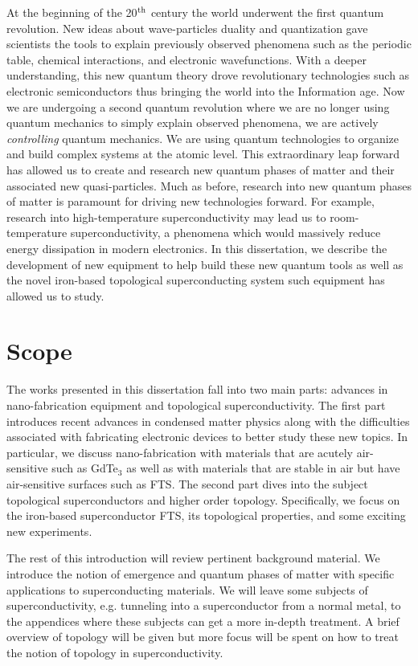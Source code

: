 At the beginning of the 20$\textsuperscript{th}$ century the world underwent the first quantum revolution. New ideas about wave-particles duality and quantization gave scientists the tools to explain previously observed phenomena such as the periodic table, chemical interactions, and electronic wavefunctions. With a deeper understanding, this new quantum theory drove revolutionary technologies such as electronic semiconductors thus bringing the world into the Information age. Now we are undergoing a second quantum revolution where we are no longer using quantum mechanics to simply explain observed phenomena, we are actively \textit{controlling} quantum mechanics.\cite{Dowling2003} We are using quantum technologies to organize and build complex systems at the atomic level. This extraordinary leap forward has allowed us to create and research new quantum phases of matter and their associated new quasi-particles. Much as before, research into new quantum phases of matter is paramount for driving new technologies forward. For example, research into high-temperature superconductivity may lead us to room-temperature superconductivity, a phenomena which would massively reduce energy dissipation in modern electronics. In this dissertation, we describe the development of new equipment to help build these new quantum tools as well as the novel iron-based topological superconducting system such equipment has allowed us to study.
\section{Scope}
The works presented in this dissertation fall into two main parts: advances in nano-fabrication equipment and topological superconductivity. The first part introduces recent advances in condensed matter physics along with the difficulties associated with fabricating electronic devices to better study these new topics. In particular, we discuss nano-fabrication with materials that are acutely air-sensitive such as GdTe$_{3}$ as well as with materials that are stable in air but have air-sensitive surfaces such as \ac{FTS}. The second part dives into the subject topological superconductors and higher order topology. Specifically, we focus on the iron-based superconductor \acl{FTS}, its topological properties, and some exciting new experiments.\par
The rest of this introduction will review pertinent background material. We introduce the notion of emergence and quantum phases of matter with specific applications to superconducting materials. We will leave some subjects of superconductivity, e.g. tunneling into a superconductor from a normal metal, to the appendices where these subjects can get a more in-depth treatment. A brief overview of topology will be given but more focus will be spent on how to treat the notion of topology in superconductivity.
